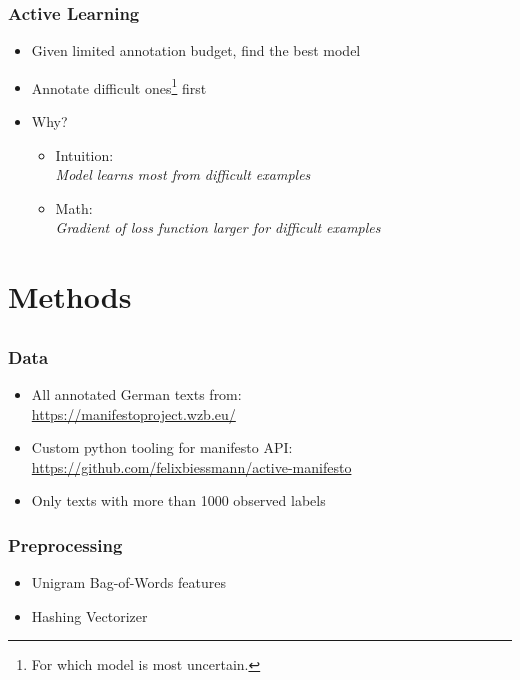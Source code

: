 \documentclass[]{beamer}
\begin{document}
\begin{frame}\frametitle{Active Learning}
\begin{itemize}[<+->]
\item Given limited annotation budget, find the best model
\item Annotate difficult ones\footnote{For which model is most uncertain.} first
\item Why?
\begin{itemize}
\item Intuition: \\
\textit{ Model learns most from difficult examples}\\
\item Math:\\
\textit{ Gradient of loss function larger for difficult examples }\\
\end{itemize}
\end{itemize}
\end{frame}

\section{Methods}
\subsection{}

\begin{frame}\frametitle{Data}
\footnotesize
\begin{itemize}
\item All annotated German texts from:\\ 
\url{https://manifestoproject.wzb.eu/} 
\item Custom python tooling for manifesto API:\\
 \url{https://github.com/felixbiessmann/active-manifesto} 
\item Only texts with more than 1000 observed labels
\end{itemize}
\end{frame}

\begin{frame}\frametitle{Preprocessing}
\begin{itemize}
\item Unigram Bag-of-Words features
\item Hashing Vectorizer
\end{itemize}
\end{frame}
\end{document}
